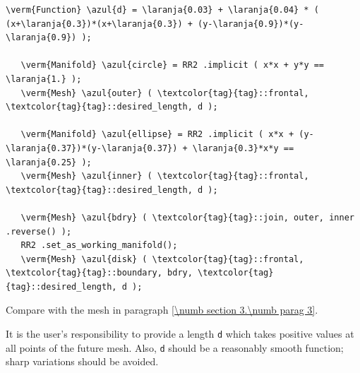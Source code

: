 \begin{Verbatim}[commandchars=\\\{\},formatcom=\small\tt,frame=single,
   label=parag-\ref{\numb section 3.\numb parag 22}.cpp,rulecolor=\color{moldura},
   baselinestretch=0.94,framesep=2mm                                            ]
   \verm{Function} \azul{d} = \laranja{0.03} + \laranja{0.04} * ( (x+\laranja{0.3})*(x+\laranja{0.3}) + (y-\laranja{0.9})*(y-\laranja{0.9}) );

   \verm{Manifold} \azul{circle} = RR2 .implicit ( x*x + y*y == \laranja{1.} );
   \verm{Mesh} \azul{outer} ( \textcolor{tag}{tag}::frontal, \textcolor{tag}{tag}::desired_length, d );

   \verm{Manifold} \azul{ellipse} = RR2 .implicit ( x*x + (y-\laranja{0.37})*(y-\laranja{0.37}) + \laranja{0.3}*x*y == \laranja{0.25} );
   \verm{Mesh} \azul{inner} ( \textcolor{tag}{tag}::frontal, \textcolor{tag}{tag}::desired_length, d );

   \verm{Mesh} \azul{bdry} ( \textcolor{tag}{tag}::join, outer, inner .reverse() );
   RR2 .set_as_working_manifold();
   \verm{Mesh} \azul{disk} ( \textcolor{tag}{tag}::frontal, \textcolor{tag}{tag}::boundary, bdry, \textcolor{tag}{tag}::desired_length, d );
\end{Verbatim}

Compare with the mesh in paragraph \ref{\numb section 3.\numb parag 3}.

It is the user's responsibility to provide a length {\small\tt d} which takes positive values
at all points of the future mesh.
Also, {\small\tt d} should be a reasonably smooth function; sharp variations should be avoided.






